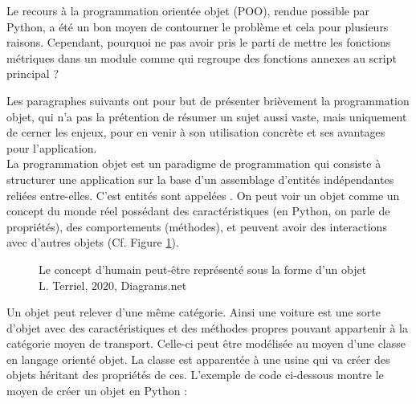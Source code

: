 Le recours à la programmation orientée objet (POO), rendue possible par Python, a été un bon moyen de contourner le problème et cela pour plusieurs raisons. Cependant, pourquoi ne pas avoir pris le parti de mettre les fonctions métriques dans un module comme  qui regroupe des fonctions annexes au script principal ? 

Les paragraphes suivants ont pour but de présenter brièvement la programmation objet, qui n'a pas la prétention de résumer un sujet aussi vaste, mais uniquement de cerner les enjeux, pour en venir à son utilisation concrète et ses avantages pour l'application. \\

La programmation objet est un paradigme de programmation qui consiste à structurer une application sur la base d'un assemblage d'entités indépendantes reliées entre-elles. C'est entités sont appelées . On peut voir un objet comme un concept du monde réel possédant des caractéristiques (en Python, on parle de propriétés), des comportements (méthodes), et peuvent avoir des interactions avec d'autres objets (Cf. Figure \ref{fig:concept_POO}). 
\begin{figure}[H]
    \centering
    \centerline{}
    \caption{Le concept d'humain peut-être représenté sous la forme d'un objet \textcopyright L. Terriel, 2020, Diagrams.net}
    \label{fig:concept_POO}
\end{figure}
\newpage
Un objet peut relever d'une même catégorie. Ainsi une voiture est une sorte d'objet avec des caractéristiques et des méthodes propres pouvant appartenir à la catégorie moyen de transport. Celle-ci peut être modélisée au moyen d'une classe en langage orienté objet. La classe est apparentée à une usine qui va créer des objets héritant des propriétés de ces. L'exemple de code ci-dessous montre le moyen de créer un objet  en Python :

